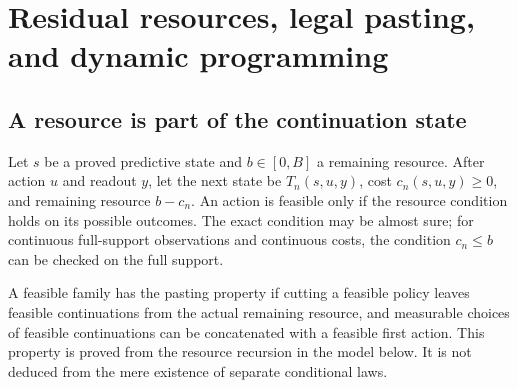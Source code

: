 \section{Residual resources, legal pasting, and dynamic programming}\label{sec:resources}
\subsection{A resource is part of the continuation state}
Let $s$ be a proved predictive state and $b\in[0,B]$ a remaining resource. After action $u$ and readout $y$, let the next state be $T_n(s,u,y)$, cost $c_n(s,u,y)\ge0$, and remaining resource $b-c_n$. An action is feasible only if the resource condition holds on its possible outcomes. The exact condition may be almost sure; for continuous full-support observations and continuous costs, the condition $c_n\le b$ can be checked on the full support.

A feasible family has the pasting property if cutting a feasible policy leaves feasible continuations from the actual remaining resource, and measurable choices of feasible continuations can be concatenated with a feasible first action. This property is proved from the resource recursion in the model below. It is not deduced from the mere existence of separate conditional laws.

